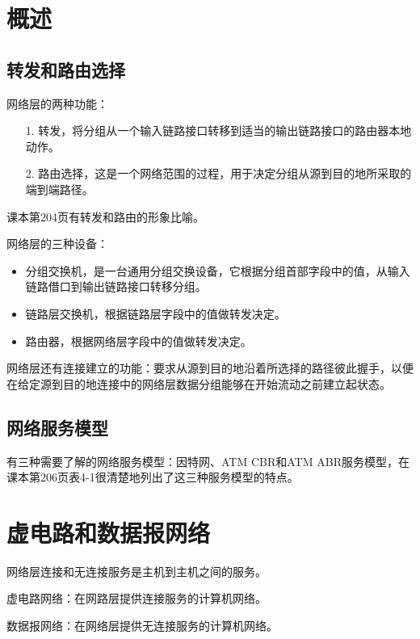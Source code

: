 \documentclass[a4paper,left=2.5cm,right=2.5cm,11pt]{article}
\begin{document}

\section{概述}
\subsection{转发和路由选择}
	网络层的两种功能：
	\begin{itemize}
		\item[1.] 转发，将分组从一个输入链路接口转移到适当的输出链路接口的路由器本地动作。
		\item[2.] 路由选择，这是一个网络范围的过程，用于决定分组从源到目的地所采取的端到端路径。
	\end{itemize}

	课本第204页有转发和路由的形象比喻。\par

	网络层的三种设备：
	\begin{itemize}
		\item 分组交换机，是一台通用分组交换设备，它根据分组首部字段中的值，从输入链路借口到输出链路接口转移分组。
		\item 链路层交换机，根据链路层字段中的值做转发决定。
		\item 路由器，根据网络层字段中的值做转发决定。
	\end{itemize}

	网络层还有连接建立的功能：要求从源到目的地沿着所选择的路径彼此握手，以便在给定源到目的地连接中的网络层数据分组能够在开始流动之前建立起状态。

\subsection{网络服务模型}
	有三种需要了解的网络服务模型：因特网、ATM CBR和ATM ABR服务模型，在课本第206页表4-1很清楚地列出了这三种服务模型的特点。

\section{虚电路和数据报网络}
	网络层连接和无连接服务是主机到主机之间的服务。\par

	虚电路网络：在网路层提供连接服务的计算机网络。\par

	数据报网络：在网络层提供无连接服务的计算机网络。\par
\end{document}
